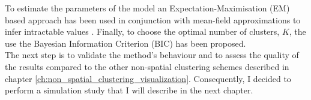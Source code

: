 To estimate the parameters of the model an Expectation-Maximisation (EM) based approach has been used in conjunction with mean-field approximations to infer intractable values \cite{Celeux01}. Finally, to choose the optimal number of clusters, $K$, the use the Bayesian Information Criterion (BIC) has been proposed.\\

The next step is to validate the method's behaviour and to assess the quality of the results compared to the other non-spatial clustering schemes described in chapter \ref{ch:non_spatial_clustering_visualization}. Consequently, I decided to perform a simulation study that I will describe in the next chapter.

